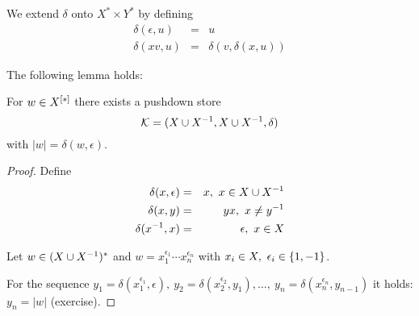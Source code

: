We extend $\delta$ onto $X^* \times Y^*$ by defining
\begin{eqnarray*}
\delta(\epsilon, u) & = & u \\
\delta(x v, u) & = & \delta(v,  \delta(x,u))
\end{eqnarray*}

The following lemma holds:
\begin{lemma}
For $w \in \mbox{${X}^{[*]}$}$ there exists a pushdown store
\[ \mbox{$\mathcal{K}$} =(X \cup {X}^{-1}, X \cup {X}^{-1}, \delta) \]
with $|w| = \delta(w, \epsilon)$.
\end{lemma}

\begin{proof}
Define
\begin{eqnarray}
\delta(x, \epsilon) & = & x,\ x\in X \cup {X}^{-1} \label{delta:1} \\
\delta(x, y) & = & yx,\ x\neq y^{-1} \label{delta:2}\\
\delta(x^{-1}, x) & = & \epsilon,\ x\in X \label{delta:3}
\end{eqnarray}

Let $w\in (X \cup {X}^{-1})^*$ and $w = x_1^{\epsilon_1} \cdots x_n^{\epsilon_n}$
with $x_i\in X,\ \epsilon_i\in \mbox{$\{1, -1\}$}$.

For the sequence $y_1 = \delta(x_1^{\epsilon_1}, \epsilon),\ y_2 =
\delta(x_2^{\epsilon_2}, y_1), \ldots,\ y_n = \delta(x_n^{\epsilon_n}, y_{n-1})$
it holds: $y_n = |w|$ (exercise).
\end{proof}


